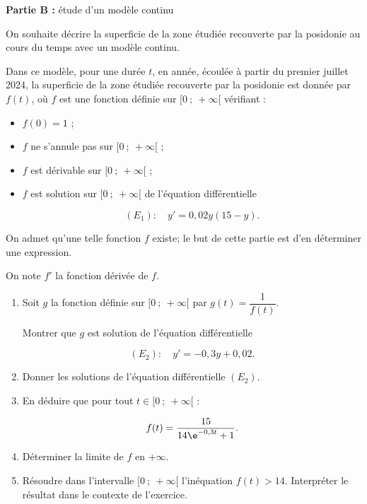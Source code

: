 \begin{center} \textbf{Partie B :} étude d'un modèle continu\end{center}

On souhaite décrire la superficie de la zone étudiée recouverte par la posidonie au cours du temps avec un modèle continu.

Dans ce modèle, pour une durée $t$, en année, écoulée à partir du premier juillet 2024, la superficie de la zone étudiée recouverte par la posidonie est donnée par
$f(t)$, où $f$ est une fonction définie sur $[0~;~ +\infty[$ vérifiant :

\begin{itemize}[label=$\bullet~$]
\item $f(0) = 1$ ;
\item $f$ ne s'annule pas sur $[0~;~ +\infty[$ ;
\item $f$ est dérivable sur $[0~;~ +\infty[$ ;
\item $f$ est solution sur $[0~;~ +\infty[$ de l'équation différentielle 

\[(E_1) : \quad y' =0,02y(15 - y).\]

\end{itemize}

On admet qu'une telle fonction $f$ existe; le but de cette partie est d'en déterminer une expression.

On note $f'$ la fonction dérivée de $f$.

\medskip

\begin{enumerate}
\item Soit $g$ la fonction définie sur $[0~;~ +\infty[$ par $g(t) = \dfrac{1}{f(t)}$.

Montrer que $g$ est solution de l'équation différentielle 

\[(E_2) : \quad y' = - 0,3y + 0,02.\]

\item Donner les solutions de l'équation différentielle $(E_2)$.
\item En déduire que pour tout $t \in  [0~;~ +\infty[$ :

\[f(t)=  \dfrac{15}{14\e^{-0,3t} + 1}.\]

\item Déterminer la limite de $f$ en $+\infty$.
\item Résoudre dans l'intervalle $[0~;~ +\infty[$ l'inéquation $f(t) > 14$. Interpréter le résultat dans le contexte de l'exercice.
\end{enumerate}
